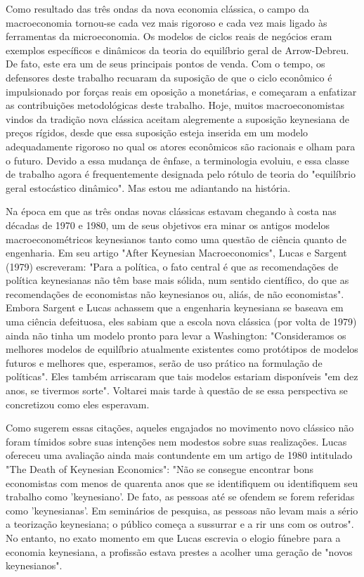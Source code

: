 \documentclass[12pt]{article}
\begin{document}
Como resultado das três ondas da nova economia clássica, o campo da macroeconomia tornou-se cada vez mais rigoroso e cada vez mais ligado às ferramentas da microeconomia. Os modelos de ciclos reais de negócios eram exemplos específicos e dinâmicos da teoria do equilíbrio geral de Arrow-Debreu. De fato, este era um de seus principais pontos de venda. Com o tempo, os defensores deste trabalho recuaram da suposição de que o ciclo econômico é impulsionado por forças reais em oposição a monetárias, e começaram a enfatizar as contribuições metodológicas deste trabalho. Hoje, muitos macroeconomistas vindos da tradição nova clássica aceitam alegremente a suposição keynesiana de preços rígidos, desde que essa suposição esteja inserida em um modelo adequadamente rigoroso no qual os atores econômicos são racionais e olham para o futuro. Devido a essa mudança de ênfase, a terminologia evoluiu, e essa classe de trabalho agora é frequentemente designada pelo rótulo de teoria do "equilíbrio geral estocástico dinâmico". Mas estou me adiantando na história.

Na época em que as três ondas novas clássicas estavam chegando à costa nas décadas de 1970 e 1980, um de seus objetivos era minar os antigos modelos macroeconométricos keynesianos tanto como uma questão de ciência quanto de engenharia. Em seu artigo "After Keynesian Macroeconomics", Lucas e Sargent (1979) escreveram: "Para a política, o fato central é que as recomendações de política keynesianas não têm base mais sólida, num sentido científico, do que as recomendações de economistas não keynesianos ou, aliás, de não economistas". Embora Sargent e Lucas achassem que a engenharia keynesiana se baseava em uma ciência defeituosa, eles sabiam que a escola nova clássica (por volta de 1979) ainda não tinha um modelo pronto para levar a Washington: "Consideramos os melhores modelos de equilíbrio atualmente existentes como protótipos de modelos futuros e melhores que, esperamos, serão de uso prático na formulação de políticas". Eles também arriscaram que tais modelos estariam disponíveis "em dez anos, se tivermos sorte". Voltarei mais tarde à questão de se essa perspectiva se concretizou como eles esperavam.

Como sugerem essas citações, aqueles engajados no movimento novo clássico não foram tímidos sobre suas intenções nem modestos sobre suas realizações. Lucas ofereceu uma avaliação ainda mais contundente em um artigo de 1980 intitulado "The Death of Keynesian Economics": "Não se consegue encontrar bons economistas com menos de quarenta anos que se identifiquem ou identifiquem seu trabalho como 'keynesiano'. De fato, as pessoas até se ofendem se forem referidas como 'keynesianas'. Em seminários de pesquisa, as pessoas não levam mais a sério a teorização keynesiana; o público começa a sussurrar e a rir uns com os outros". No entanto, no exato momento em que Lucas escrevia o elogio fúnebre para a economia keynesiana, a profissão estava prestes a acolher uma geração de "novos keynesianos".
\end{document}
